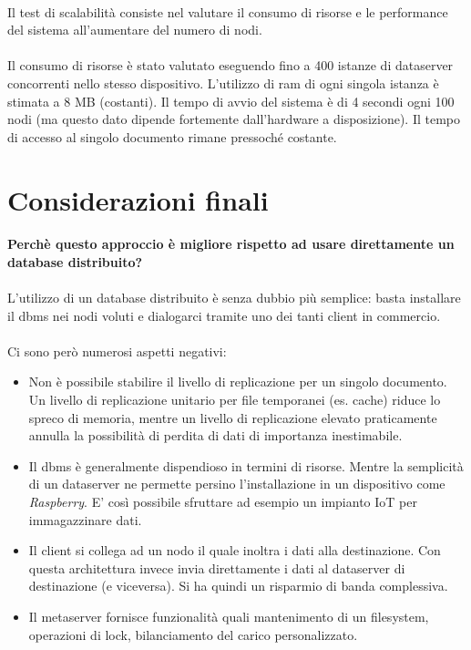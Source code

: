 \documentclass[11pt,a4paper,english]{article}
\begin{document}
\paragraph{} Il test di scalabilità consiste nel valutare il consumo di risorse e le performance del sistema all'aumentare del numero di nodi. 

\paragraph{} Il consumo di risorse è stato valutato eseguendo fino a 400 istanze di dataserver concorrenti nello stesso dispositivo. L'utilizzo di ram di ogni singola istanza è stimata a 8 MB (costanti). Il tempo di avvio del sistema è di 4 secondi ogni 100 nodi (ma questo dato dipende fortemente dall'hardware a disposizione). Il tempo di accesso al singolo documento rimane pressoché costante.

\section{Considerazioni finali}

\paragraph{Perchè questo approccio è migliore rispetto ad usare direttamente un database distribuito?} 

\paragraph{} L'utilizzo di un database distribuito è senza dubbio più semplice: basta installare il dbms nei nodi voluti e dialogarci tramite uno dei tanti client in commercio. 

\paragraph{} Ci sono però numerosi aspetti negativi: \begin{itemize}
	\item Non è possibile stabilire il livello di replicazione per un singolo documento. Un livello di replicazione unitario per file temporanei (es. cache) riduce lo spreco di memoria, mentre un livello di replicazione elevato praticamente annulla la possibilità di perdita di dati di importanza inestimabile.
	\item Il dbms è generalmente dispendioso in termini di risorse. Mentre la semplicità di un dataserver ne permette persino l'installazione in un dispositivo come \emph{Raspberry}. E' così possibile sfruttare ad esempio un impianto IoT per immagazzinare dati. 
	\item Il client si collega ad un nodo il quale inoltra i dati alla destinazione. Con questa architettura invece invia direttamente i dati al dataserver di destinazione (e viceversa). Si ha quindi un risparmio di banda complessiva.  
	\item Il metaserver fornisce funzionalità quali mantenimento di un filesystem, operazioni di lock, bilanciamento del carico personalizzato. 
\end{itemize}
\end{document}
